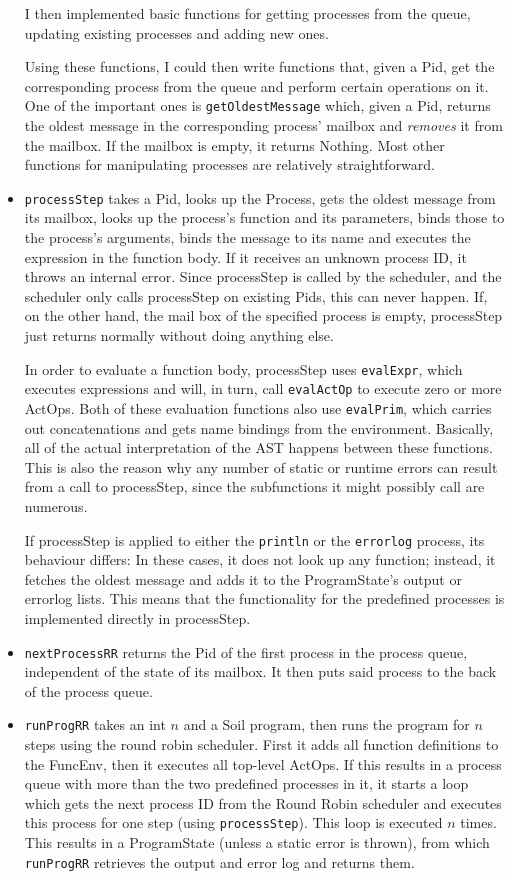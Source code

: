 \documentclass[a4paper]{article}
\begin{document}
\begin{itemize}
  I then implemented basic functions for getting processes from the queue, updating existing processes and adding new ones. 
  
  Using these functions, I could then write functions that, given a Pid, get the corresponding process from the queue and perform certain operations on it. One of the important ones is \texttt{getOldestMessage} which, given a Pid, returns the oldest message in the corresponding process' mailbox and \emph{removes} it from the mailbox. If the mailbox is empty, it returns Nothing. Most other functions for manipulating processes are relatively straightforward.
  \item \texttt{processStep} takes a Pid, looks up the Process, gets the oldest message from its mailbox, looks up the process's function and its parameters, binds those to the process's arguments, binds the message to its name and executes the expression in the function body. If it receives an unknown process ID, it throws an internal error. Since processStep is called by the scheduler, and the scheduler only calls processStep on existing Pids, this can never happen. If, on the other hand, the mail box of the specified process is empty, processStep just returns normally without doing anything else.
  
  In order to evaluate a function body, processStep uses \texttt{evalExpr}, which executes expressions and will, in turn, call \texttt{evalActOp} to execute zero or more ActOps. Both of these evaluation functions also use \texttt{evalPrim}, which carries out concatenations and gets name bindings from the environment. Basically, all of the actual interpretation of the AST happens between these functions. This is also the reason why any number of static or runtime errors can result from a call to processStep, since the subfunctions it might possibly call are numerous.
  
  If processStep is applied to either the \texttt{println} or the \texttt{errorlog} process, its behaviour differs: In these cases, it does not look up any function; instead, it fetches the oldest message and adds it to the ProgramState's output or errorlog lists. This means that the functionality for the predefined processes is implemented directly in processStep.
  \item \texttt{nextProcessRR} returns the Pid of the first process in the process queue, independent of the state of its mailbox. It then puts said process to the back of the process queue.  
  \item \texttt{runProgRR} takes an int $n$ and a Soil program, then runs the program for $n$ steps using the round robin scheduler. First it adds all function definitions to the FuncEnv, then it executes all top-level ActOps. If this results in a process queue with more than the two predefined processes in it, it starts a loop which gets the next process ID from the Round Robin scheduler and executes this process for one step (using \texttt{processStep}). This loop is executed $n$ times. This results in a ProgramState (unless a static error is thrown), from which \texttt{runProgRR} retrieves the output and error log and returns them. 
  

\end{itemize}
\end{document}
